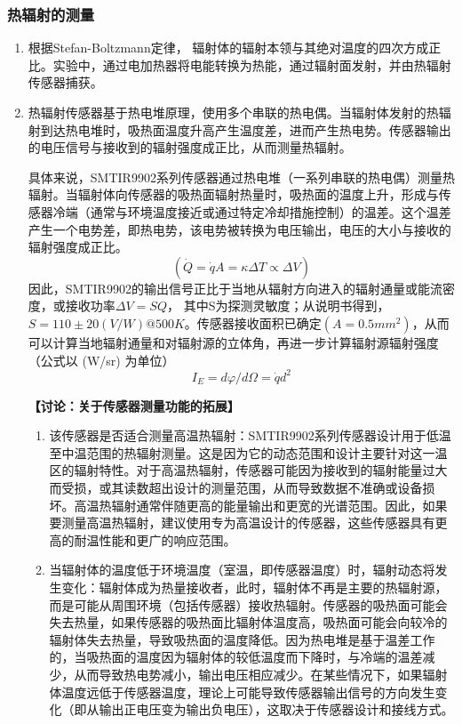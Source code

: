 \documentclass[dvipsnames, svgnames,a4paper,11pt]{article}
\begin{document}
	\subsubsection{热辐射的测量}
	\begin{enumerate}
		\item 根据Stefan-Boltzmann定律， 辐射体的辐射本领与其绝对温度的四次方成正比。实验中，通过电加热器将电能转换为热能，通过辐射面发射，并由热辐射传感器捕获。
		
		\item 热辐射传感器基于热电堆原理，使用多个串联的热电偶。当辐射体发射的热辐射到达热电堆时，吸热面温度升高产生温度差，进而产生热电势。传感器输出的电压信号与接收到的辐射强度成正比，从而测量热辐射。
		
		具体来说，SMTIR9902系列传感器通过热电堆（一系列串联的热电偶）测量热辐射。当辐射体向传感器的吸热面辐射热量时，吸热面的温度上升，形成与传感器冷端（通常与环境温度接近或通过特定冷却措施控制）的温差。这个温差产生一个电势差，即热电势，该电势被转换为电压输出，电压的大小与接收的辐射强度成正比。
		\[
		(\dot{Q} = \dot{q} A = \kappa\Delta 𝑇 \propto \Delta V)
		\]
		因此，SMTIR9902的输出信号正比于当地从辐射方向进入的辐射通量或能流密度，或接收功率$\Delta V=SQ$， 其中S为探测灵敏度；从说明书得到，$ S=110\pm20(V/W)@500K$。传感器接收面积已确定$(A= 0.5{mm}^2)$，从而可以计算当地辐射通量和对辐射源的立体角，再进一步计算辐射源辐射强度（公式以 (W/sr) 为单位）
		\[
		I_E= d\varphi /d\Omega=\dot{q}d^2
		\]
		
		\quad
		
		\textbf{【讨论：关于传感器测量功能的拓展】}
		\begin{enumerate}
			\item 该传感器是否适合测量高温热辐射：SMTIR9902系列传感器设计用于低温至中温范围的热辐射测量。这是因为它的动态范围和设计主要针对这一温区的辐射特性。对于高温热辐射，传感器可能因为接收到的辐射能量过大而受损，或其读数超出设计的测量范围，从而导致数据不准确或设备损坏。高温热辐射通常伴随更高的能量输出和更宽的光谱范围。因此，如果要测量高温热辐射，建议使用专为高温设计的传感器，这些传感器具有更高的耐温性能和更广的响应范围。
			
			\item 当辐射体的温度低于环境温度（室温，即传感器温度）时，辐射动态将发生变化：辐射体成为热量接收者，此时，辐射体不再是主要的热辐射源，而是可能从周围环境（包括传感器）接收热辐射。传感器的吸热面可能会失去热量，如果传感器的吸热面比辐射体温度高，吸热面可能会向较冷的辐射体失去热量，导致吸热面的温度降低。因为热电堆是基于温差工作的，当吸热面的温度因为辐射体的较低温度而下降时，与冷端的温差减少，从而导致热电势减小，输出电压相应减少。在某些情况下，如果辐射体温度远低于传感器温度，理论上可能导致传感器输出信号的方向发生变化（即从输出正电压变为输出负电压），这取决于传感器设计和接线方式。
			

\end{enumerate}
\end{enumerate}
\end{document}
